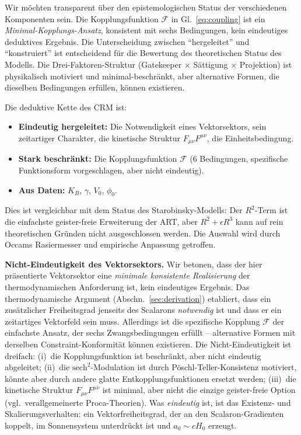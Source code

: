 \documentclass[aps,prd,twocolumn,superscriptaddress,nofootinbib]{revtex4-2}
\begin{document}
Wir m\"ochten transparent \"uber den epistemologischen Status der verschiedenen Komponenten sein. Die Kopplungsfunktion $\mathcal{F}$ in Gl.~\eqref{eq:coupling} ist ein \textit{Minimal-Kopplungs-Ansatz}, konsistent mit sechs Bedingungen, kein eindeutiges deduktives Ergebnis. Die Unterscheidung zwischen ``hergeleitet'' und ``konstruiert'' ist entscheidend f\"ur die Bewertung des theoretischen Status des Modells. Die Drei-Faktoren-Struktur (Gatekeeper $\times$ S\"attigung $\times$ Projektion) ist physikalisch motiviert und minimal-beschr\"ankt, aber alternative Formen, die dieselben Bedingungen erf\"ullen, k\"onnen existieren.

Die deduktive Kette des CRM ist:
\begin{itemize}
\item \textbf{Eindeutig hergeleitet:} Die Notwendigkeit eines Vektorsektors, sein zeitartiger Charakter, die kinetische Struktur $F_{\mu\nu}F^{\mu\nu}$, die Einheitsbedingung.
\item \textbf{Stark beschr\"ankt:} Die Kopplungsfunktion $\mathcal{F}$ (6 Bedingungen, spezifische Funktionsform vorgeschlagen, aber nicht eindeutig).
\item \textbf{Aus Daten:} $K_B$, $\gamma$, $V_0$, $\phi_0$.
\end{itemize}

Dies ist vergleichbar mit dem Status des Starobinsky-Modells: Der $R^2$-Term ist die einfachste geister-freie Erweiterung der ART, aber $R^2 + \epsilon R^3$ kann auf rein theoretischen Gr\"unden nicht ausgeschlossen werden. Die Auswahl wird durch Occams Rasiermesser und empirische Anpassung getroffen.

\textbf{Nicht-Eindeutigkeit des Vektorsektors.} Wir betonen, dass der hier pr\"asentierte Vektorsektor eine \emph{minimale konsistente Realisierung} der thermodynamischen Anforderung ist, kein eindeutiges Ergebnis. Das thermodynamische Argument (Abschn.~\ref{sec:derivation}) etabliert, dass ein zus\"atzlicher Freiheitsgrad jenseits des Scalarons \emph{notwendig} ist und dass er ein zeitartiges Vektorfeld sein muss. Allerdings ist die spezifische Kopplung $\mathcal{F}$ der einfachste Ansatz, der sechs Zwangsbedingungen erf\"ullt -- alternative Formen mit derselben Constraint-Konformit\"at k\"onnen existieren. Die Nicht-Eindeutigkeit ist dreifach: (i)~die Kopplungsfunktion ist beschr\"ankt, aber nicht eindeutig abgeleitet; (ii)~die $\mathrm{sech}^2$-Modulation ist durch P\"oschl-Teller-Konsistenz motiviert, k\"onnte aber durch andere glatte Entkopplungsfunktionen ersetzt werden; (iii)~die kinetische Struktur $F_{\mu\nu}F^{\mu\nu}$ ist minimal, aber nicht die einzige geister-freie Option (vgl.\ verallgemeinerte Proca-Theorien). Was \emph{eindeutig} ist, ist das Existenz- und Skalierungsverhalten: ein Vektorfreiheitsgrad, der an den Scalaron-Gradienten koppelt, im Sonnensystem unterdr\"uckt ist und $a_0 \sim cH_0$ erzeugt.
\end{document}
